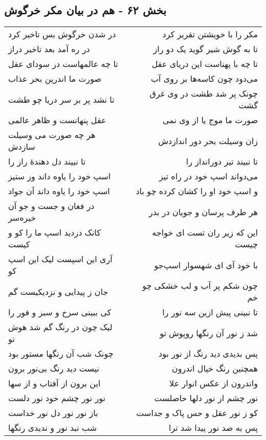 \begin{center}
\section*{بخش ۶۲ - هم در بیان مکر خرگوش}
\label{sec:sh062}
\begin{longtable}{l p{0.5cm} r}
در شدن خرگوش بس تاخیر کرد
&&
مکر را با خویشتن تقریر کرد
\\
در ره آمد بعد تاخیر دراز
&&
تا به گوش شیر گوید یک دو راز
\\
تا چه عالمهاست در سودای عقل
&&
تا چه با پهناست این دریای عقل
\\
صورت ما اندرین بحر عذاب
&&
می‌دود چون کاسه‌ها بر روی آب
\\
تا نشد پر بر سر دریا چو طشت
&&
چونک پر شد طشت در وی غرق گشت
\\
عقل پنهانست و ظاهر عالمی
&&
صورت ما موج یا از وی نمی
\\
هر چه صورت می وسیلت سازدش
&&
زان وسیلت بحر دور اندازدش
\\
تا نبیند دل دهندهٔ راز را
&&
تا نبیند تیر دورانداز را
\\
اسپ خود را یاوه داند وز ستیز
&&
می‌دواند اسپ خود در راه تیز
\\
اسپ خود را یاوه داند آن جواد
&&
و اسپ خود او را کشان کرده چو باد
\\
در فغان و جست و جو آن خیره‌سر
&&
هر طرف پرسان و جویان در بدر
\\
کانک دزدید اسپ ما را کو و کیست
&&
این که زیر ران تست ای خواجه چیست
\\
آری این اسپست لیک این اسپ کو
&&
با خود آی ای شهسوار اسپ‌جو
\\
جان ز پیدایی و نزدیکیست گم
&&
چون شکم پر آب و لب خشکی چو خم
\\
کی ببینی سرخ و سبز و فور را
&&
تا نبینی پیش ازین سه نور را
\\
لیک چون در رنگ گم شد هوش تو
&&
شد ز نور آن رنگها روپوش تو
\\
چونک شب آن رنگها مستور بود
&&
پس بدیدی دید رنگ از نور بود
\\
نیست دید رنگ بی‌نور برون
&&
همچنین رنگ خیال اندرون
\\
این برون از آفتاب و از سها
&&
واندرون از عکس انوار علا
\\
نور نور چشم خود نور دلست
&&
نور چشم از نور دلها حاصلست
\\
باز نور نور دل نور خداست
&&
کو ز نور عقل و حس پاک و جداست
\\
شب نبد نور و ندیدی رنگها
&&
پس به ضد نور پیدا شد ترا
\\

\end{longtable}
\end{center}
